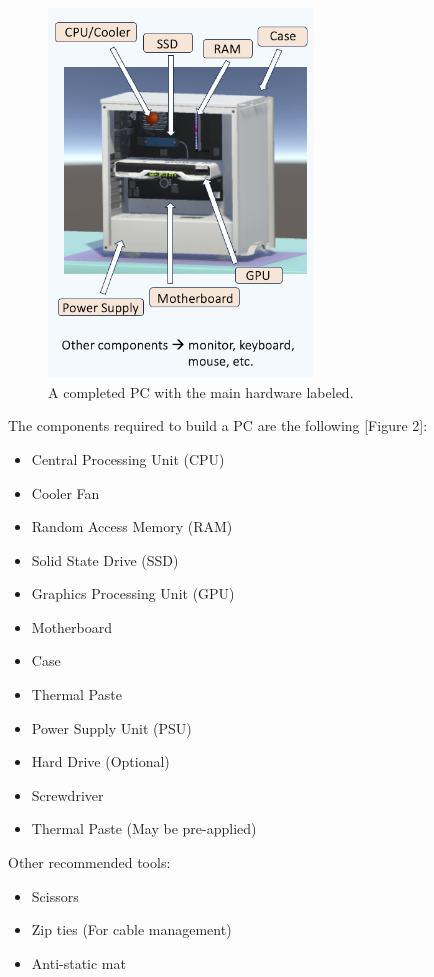 \documentclass[10pt,twocolumn]{article}
\begin{document}
\begin{figure}
    \centering
    \includegraphics[width=7cm]{images/LabeledPC.png}
    \caption{A completed PC with the main hardware labeled.}
\end{figure}

\par The components required to build a PC are the following [Figure 2]: 

\begin{itemize}
    \item Central Processing Unit (CPU)
    \item Cooler Fan
    \item Random Access Memory (RAM)
    \item Solid State Drive (SSD)
    \item Graphics Processing Unit (GPU) 
    \item Motherboard 
    \item Case 
    \item Thermal Paste
    \item Power Supply Unit (PSU)
    \item Hard Drive (Optional)
    \item Screwdriver 
    \item Thermal Paste (May be pre-applied)    
\end{itemize}

\par Other recommended tools: 
\begin{itemize}
    \item Scissors
    \item Zip ties (For cable management)
    \item Anti-static mat
\end{itemize}
\end{document}
